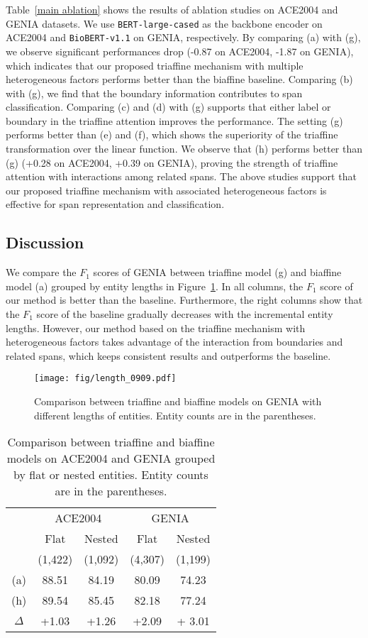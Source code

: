 \documentclass[11pt]{article}
\begin{document}
Table~\ref{main ablation} shows the results of ablation studies on ACE2004 and GENIA datasets. We use \texttt{BERT-large-cased} as the backbone encoder on ACE2004 and \texttt{BioBERT-v1.1} on GENIA, respectively.
By comparing (a) with (g), we observe significant performances drop (-0.87 on ACE2004, -1.87 on GENIA), which indicates that our proposed triaffine mechanism with multiple heterogeneous factors performs better than the biaffine baseline.
Comparing (b) with (g), we find that the boundary information contributes to span classification.
Comparing (c) and (d) with (g) supports that either label or boundary in the triaffine attention improves the performance.
The setting (g) performs better than (e) and (f), which shows the superiority of the triaffine transformation over the linear function.
We observe that (h) performs better than (g) (+0.28 on ACE2004, +0.39 on GENIA), proving the strength of triaffine attention with interactions among related spans.
The above studies support that our proposed triaffine mechanism with associated heterogeneous factors is effective for span representation and classification.

\subsection{Discussion}


We compare the $F_1$ scores of GENIA between triaffine model (g) and biaffine model (a) grouped by entity lengths in Figure~\ref{ablation:length}. In all columns, the $F_1$ score of our method is
better than the baseline. Furthermore, the right columns show that the $F_1$ score of the baseline gradually decreases with the incremental entity lengths. However, our method based on the triaffine mechanism with heterogeneous factors takes advantage of the interaction from boundaries and related spans, which keeps consistent results and outperforms the baseline.

\begin{figure}[t]
\centering
\texttt{[image: fig/length\_0909.pdf]}
\caption{Comparison between triaffine and biaffine models on GENIA with different lengths of entities. Entity counts are in the parentheses.}
\label{ablation:length}
\end{figure}

\begin{table}[h]
\small
\centering
\begin{tabular}{ccccc}
\toprule
 & \multicolumn{2}{c}{ACE2004} & \multicolumn{2}{c}{GENIA} \\
 & Flat  & Nested & Flat & Nested\\
  & (1,422)  & (1,092) & (4,307) &  (1,199)\\
\midrule
(a) & 88.51 & 84.19 & 80.09 & 74.23\\
(h) & 89.54 & 85.45 & 82.18 & 77.24\\
$\Delta$ & +1.03 & +1.26 & +2.09 & + 3.01 \\
\bottomrule
\end{tabular}
\centering
\caption{Comparison between triaffine and biaffine models on ACE2004 and GENIA grouped by flat or nested entities. Entity counts are in the parentheses.}
\label{table:nest}
\end{table}
\end{document}
